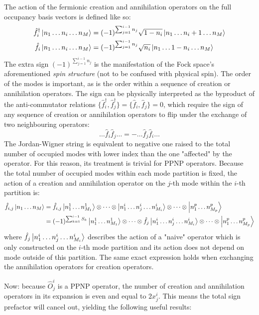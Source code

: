 \documentclass[12pt]{article}
\newcommand{\hc}{^\dagger}
\begin{document}
	The action of the fermionic creation and annihilation operators on the full occupancy basis vectors is defined like so:
	\begin{align}
	\hat{f}_i\hc \ket{n_1 \dots n_i \dots n_M} &= (-1)^{\sum_{j=1}^{i-1} n_j} \sqrt{1 - n_i} \ket{n_1 \dots n_i + 1 \dots n_M}\\
	\hat{f}_i \ket{n_1 \dots n_i \dots n_M} &= (-1)^{\sum_{j=1}^{i-1} n_j} \sqrt{n_i} \ket{n_1 \dots 1 - n_i \dots n_M}
	\end{align}
	The extra sign $(-1)^{\sum_{j=1}^{i-1} n_j}$ is the manifestation of the Fock space's aforementioned \textit{spin structure} (not to be confused with physical spin). The order of the modes is important, as is the order within a sequence of creation or annihilation operators. The sign can be physically interpreted as the byproduct of the anti-commutator relations $\{\hat{f}_i\hc, \hat{f}_j\hc\} = \{\hat{f}_i, \hat{f}_j\} = 0$, which require the sign of any sequence of creation or annihilation operators to flip under the exchange of two neighbouring operators:
	\begin{equation}
	\dots \hat{f}_i \hat{f}_j \dots = - \dots \hat{f}_j \hat{f}_i \dots
	\end{equation}
	The Jordan-Wigner string is equivalent to negative one raised to the total number of occupied modes with lower index than the one "affected" by the operator. For this reason, its treatment is trivial for PPNP operators. Because the total number of occupied modes within each mode partition is fixed, the action of a creation and annihilation operator on the $j$-th mode within the $i$-th partition is:
	\begin{align}
	\hat{f}_{i,j} \ket{n_1 \dots n_M} &= \hat{f}_{i,j} \ket{n^1_1 \dots n^1_{M_1}} \otimes \dots \otimes \ket{n^i_1 \dots n^i_j \dots n^i_{M_i}} \otimes \dots \otimes \ket{n^p_1 \dots n^p_{M_p}}\nonumber\\
	&= (-1)^{\sum_{k = 1}^{i - 1} S_k} \ket{n^1_1 \dots n^1_{M_1}} \otimes \dots \otimes \hat{f}_{j} \ket{n^i_1 \dots n^i_j \dots n^i_{M_i}} \otimes \dots \otimes \ket{n^p_1 \dots n^p_{M_p}}
	\end{align}
	where $\hat{f}_{j} \ket{n^i_1 \dots n^i_j \dots n^i_{M_i}}$ describes the action of a "naive" operator which is only constructed on the $i$-th mode partition and its action does not depend on mode outside of this partition. The same exact expression holds when exchanging the annihilation operators for creation operators.
	
	Now: because $\hat{O}^i_j$ is a PPNP operator, the number of creation and annihilation operators in its expansion is even and equal to $2x^i_j$. This means the total sign prefactor will cancel out, yielding the following useful results:
	
\end{document}
